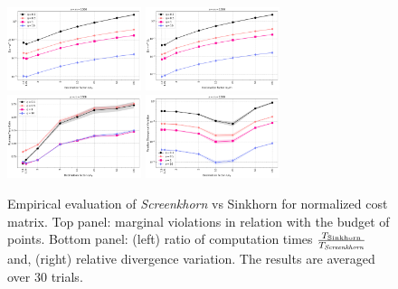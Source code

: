 \begin{figure}[t]
	\begin{center}
		\includegraphics[width=0.35\textwidth]{./figs/norm_M_Mu_marginals_toy_n1000}\hspace{2cm}
		\includegraphics[width=0.35\textwidth]{./figs/norm_M_Nu_marginals_toy_n1000} \\
		\includegraphics[width=0.35\textwidth]{./figs/norm_M_time_toy_n1000}\hspace{2cm}
		\includegraphics[width=0.35\textwidth]{./figs/norm_M_div_toy_n1000}
	\end{center}
	\caption{Empirical evaluation of \emph{Screenkhorn} vs Sinkhorn for normalized cost matrix. Top panel: marginal violations in relation with the budget of points. Bottom panel: (left) ratio of computation times    $\frac{T_{\text{Sinkhorn}}}{T_{\text{\emph{Screenkhorn}}}}$ and, (right) relative divergence variation. The results are averaged over $30$ trials.} 
		\label{fig:margin_expe}
\end{figure}
